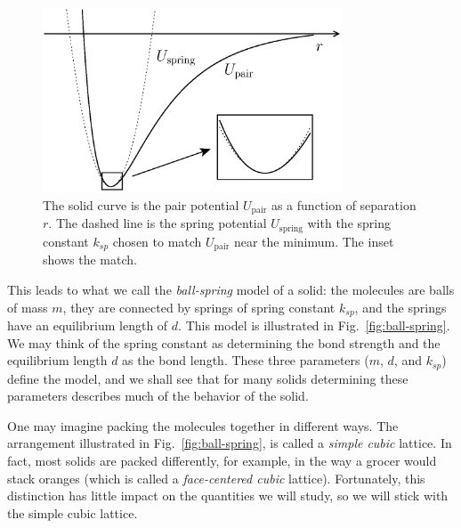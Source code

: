 
\begin{figure}
\begin{center}
\includegraphics[width=3.5in]{thermal_energy_and_solids/pair_potential_spring.eps}
\caption{The solid curve is the pair potential $U_\text{pair}$ as a
  function of separation $r$.  The dashed line is the spring potential
  $U_\text{spring}$ with the spring constant $k_{sp}$ chosen to match
  $U_\text{pair}$ near the minimum.  The inset shows the match.}
\label{fig:pair_potential_spring}
\end{center}
\end{figure}


This leads to what we call the {\it ball-spring\/} model of a solid:
the molecules are balls of mass $m$, they are connected by springs of
spring constant $k_{sp}$, and the springs have an equilibrium length
of $d$.  This model is illustrated in Fig.~\ref{fig:ball-spring}.  We
may think of the spring constant as determining the bond strength and
the equilibrium length $d$ as the bond length.  These three parameters
($m$, $d$, and $k_{sp}$) define the model, and we shall see that for
many solids determining these parameters describes much of the
behavior of the solid.

One may imagine packing the molecules together in different ways.  The
arrangement illustrated in Fig.~\ref{fig:ball-spring}, is called a
{\it simple cubic} lattice.  In fact, most solids are packed
differently, for example, in the way a grocer would stack oranges
(which is called a {\it face-centered cubic} lattice).  Fortunately,
this distinction has little impact on the quantities we will study, so
we will stick with the simple cubic lattice.

